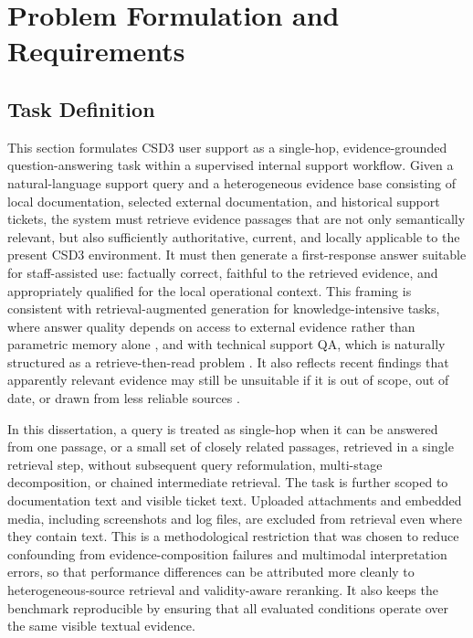 \chapter{Problem Formulation and Requirements}
\label{cha:problem}

\section{Task Definition}
\label{sec:task}

This section formulates \ac{CSD3} user support as a single-hop, evidence-grounded question-answering task within a supervised internal support workflow. Given a natural-language support query and a heterogeneous evidence base consisting of local documentation, selected external documentation, and historical support tickets, the system must retrieve evidence passages that are not only semantically relevant, but also sufficiently authoritative, current, and locally applicable to the present \ac{CSD3} environment. It must then generate a first-response answer suitable for staff-assisted use: factually correct, faithful to the retrieved evidence, and appropriately qualified for the local operational context. This framing is consistent with retrieval-augmented generation for knowledge-intensive tasks, where answer quality depends on access to external evidence rather than parametric memory alone \citep{lewisRetrievalaugmentedGenerationKnowledgeintensive2020}, and with technical support \ac{QA}, which is naturally structured as a retrieve-then-read problem \citep{yuTechnicalQuestionAnswering2021}. It also reflects recent findings that apparently relevant evidence may still be unsuitable if it is out of scope, out of date, or drawn from less reliable sources \citep{liYouKnowWhat2024,hwangRetrievalAugmentedGenerationEstimation2025}. 

In this dissertation, a query is treated as single-hop when it can be answered from one passage, or a small set of closely related passages, retrieved in a single retrieval step, without subsequent query reformulation, multi-stage decomposition, or chained intermediate retrieval. The task is further scoped to documentation text and visible ticket text. Uploaded attachments and embedded media, including screenshots and log files, are excluded from retrieval even where they contain text. This is a methodological restriction that was chosen to reduce confounding from evidence-composition failures and multimodal interpretation errors, so that performance differences can be attributed more cleanly to heterogeneous-source retrieval and validity-aware reranking. It also keeps the benchmark reproducible by ensuring that all evaluated conditions operate over the same visible textual evidence. 

